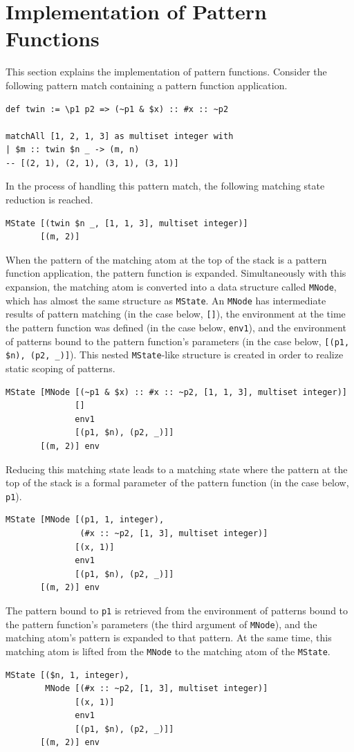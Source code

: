 \section{Implementation of Pattern Functions}\label{mechanism-pat-func}

This section explains the implementation of pattern functions.
Consider the following pattern match containing a pattern function application.
\begin{lstlisting}[language=egison,numbers=none]
def twin := \p1 p2 => (~p1 & $x) :: #x :: ~p2

matchAll [1, 2, 1, 3] as multiset integer with
| $m :: twin $n _ -> (m, n)
-- [(2, 1), (2, 1), (3, 1), (3, 1)]
\end{lstlisting}
In the process of handling this pattern match, the following matching state reduction is reached.
\begin{lstlisting}[language=egison,numbers=none]
MState [(twin $n _, [1, 1, 3], multiset integer)]
       [(m, 2)]
\end{lstlisting}
When the pattern of the matching atom at the top of the stack is a pattern function application, the pattern function is expanded.
Simultaneously with this expansion, the matching atom is converted into a data structure called \lstinline{MNode}, which has almost the same structure as \lstinline{MState}.
An \lstinline{MNode} has intermediate results of pattern matching (in the case below, \lstinline{[]}), the environment at the time the pattern function was defined (in the case below, \lstinline{env1}), and the environment of patterns bound to the pattern function's parameters (in the case below, \lstinline{[(p1, $n), (p2, _)]}).
This nested \lstinline{MState}-like structure is created in order to realize static scoping of patterns.
\begin{lstlisting}[language=egison,numbers=none]
MState [MNode [(~p1 & $x) :: #x :: ~p2, [1, 1, 3], multiset integer)]
              []
              env1
              [(p1, $n), (p2, _)]]
       [(m, 2)] env
\end{lstlisting}
Reducing this matching state leads to a matching state where the pattern at the top of the stack is a formal parameter of the pattern function (in the case below, \lstinline{p1}).
\begin{lstlisting}[language=egison,numbers=none]
MState [MNode [(p1, 1, integer),
               (#x :: ~p2, [1, 3], multiset integer)]
              [(x, 1)]
              env1
              [(p1, $n), (p2, _)]]
       [(m, 2)] env
\end{lstlisting}
The pattern bound to \lstinline{p1} is retrieved from the environment of patterns bound to the pattern function's parameters (the third argument of \lstinline{MNode}), and the matching atom's pattern is expanded to that pattern.
At the same time, this matching atom is lifted from the \lstinline{MNode} to the matching atom of the \lstinline{MState}.
\begin{lstlisting}[language=egison,numbers=none]
MState [($n, 1, integer),
        MNode [(#x :: ~p2, [1, 3], multiset integer)]
              [(x, 1)]
              env1
              [(p1, $n), (p2, _)]]
       [(m, 2)] env
\end{lstlisting}


